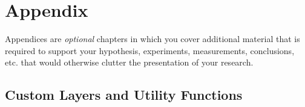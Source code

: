 \chapter{Appendix}\label{appendix}
Appendices are \emph{optional} chapters in which you cover additional material that is required to support your
hypothesis, experiments, measurements, conclusions, etc. that would otherwise
clutter the presentation of your research.

\section{Custom Layers and Utility Functions}
\label{app:custom_layers}